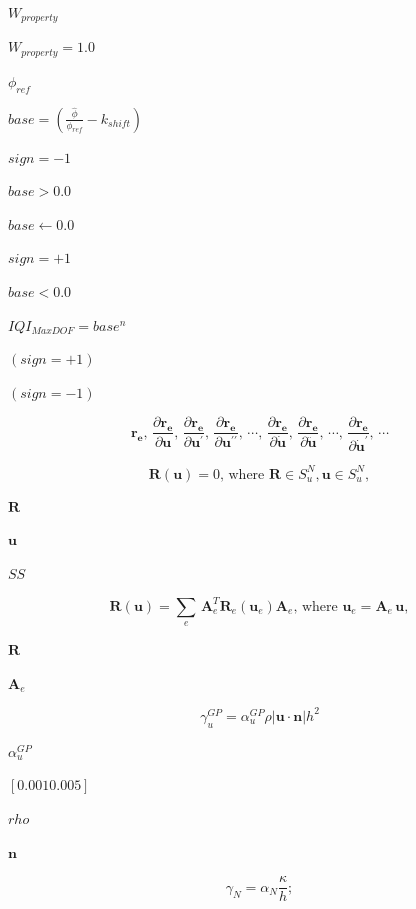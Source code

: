\documentclass{article}
\begin{document}
$ W_{property} $
\pagebreak

$ W_{property}=1.0 $
\pagebreak

$ \phi_{ref} $
\pagebreak

$ base = ( \frac {\hat{\phi}}{\phi_{ref}} - k_{shift} ) $
\pagebreak

$ sign = -1 $
\pagebreak

$ base > 0.0 $
\pagebreak

$ base \gets 0.0 $
\pagebreak

$ sign = +1 $
\pagebreak

$ base < 0.0 $
\pagebreak

$ IQI_{MaxDOF} = base^n $
\pagebreak

$ ( sign = +1 ) $
\pagebreak

$ ( sign = -1 ) $
\pagebreak

\[
    \mathbf{r_e}, \,
    \frac{\partial  \mathbf{r_e} }{\partial \mathbf{u}} , \,
    \frac{\partial  \mathbf{r_e} }{\partial \mathbf{u}^{\prime}} , \,
    \frac{\partial  \mathbf{r_e} }{\partial \mathbf{u}^{\prime\prime}} , \,
    \cdots , \,
    \frac{\partial  \mathbf{r_e} }{\partial \mathbf{\dot u}} , \,
    \frac{\partial  \mathbf{r_e} }{\partial \mathbf{\ddot u}} , \,
    \cdots , \,
    \frac{\partial  \mathbf{r_e} }{\partial \mathbf{\dot u}^{\prime}} , \,
    \cdots
\]
\pagebreak

\[
\mathbf{R} \left( \mathbf{u}  \right) = 0 \mbox{, where } \mathbf{R} \in S^N_u, \mathbf{u} \in S^N_u,
\]
\pagebreak

$\mathbf{R}$
\pagebreak

$\mathbf{u}$
\pagebreak

$SS$
\pagebreak

\[
\mathbf{R} \left( \mathbf{u}  \right) = \sum_e \,\mathbf{A}_e^T \mathbf{R}_e \left( \mathbf{u}_e  \right) \mathbf{A}_e \mbox{, where }  \mathbf{u}_e = \mathbf{A}_e \, \mathbf{u},   
\]
\pagebreak

$ \mathbf{R} $
\pagebreak

$ \mathbf{A}_e $
\pagebreak

\[
\gamma_{u}^{GP} = \alpha_{u}^{GP} \rho |\mathbf{u} \cdot \mathbf{n}| h^2
\]
\pagebreak

$ \alpha_{u}^{GP} $
\pagebreak

$ [ 0.001 0.005 ] $
\pagebreak

$ rho $
\pagebreak

$ \mathbf{n} $
\pagebreak

\[
\gamma_{N} = \alpha_{N} \frac{ \kappa }{ h };
\]
\pagebreak
\end{document}
